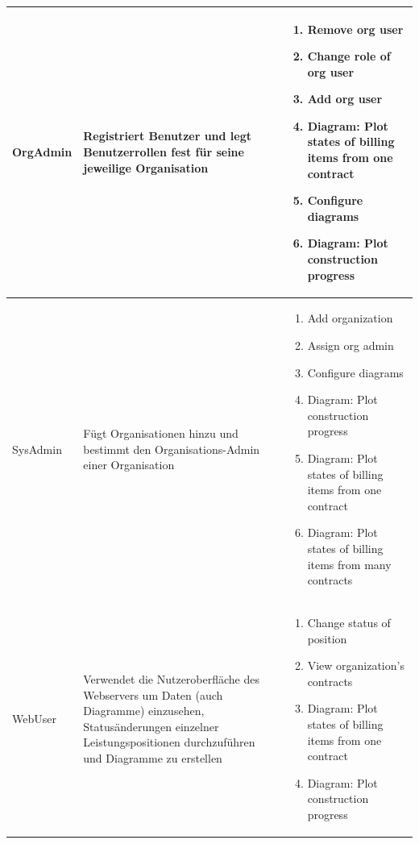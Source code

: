 \begin{longtable}[c]{|p{2cm}|p{6cm}|p{6cm}|}
    OrgAdmin        & Registriert Benutzer und legt Benutzerrollen fest für seine jeweilige Organisation                                                                                                      &
    \begin{enumerate}
        \item Remove org user
        \item Change role of org user
        \item Add org user
        \item Diagram: Plot states of billing items from one contract
        \item Configure diagrams
        \item Diagram: Plot construction progress
    \end{enumerate}                                                                                                                                                                                                                        \\ \hline
    SysAdmin        & F\"ugt Organisationen hinzu und bestimmt den Organisations-Admin einer Organisation                                                                                                     &
    \begin{enumerate}
        \item Add organization
        \item Assign org admin
        \item Configure diagrams
        \item Diagram: Plot construction progress
        \item Diagram: Plot states of billing items from one contract
        \item Diagram: Plot states of billing items from many contracts
    \end{enumerate}                                                                                                                                                                                                                        \\ \hline
    WebUser         & Verwendet die Nutzeroberfl\"ache des Webservers um Daten (auch Diagramme) einzusehen,  Status\"anderungen einzelner Leistungspositionen durchzuf\"uhren und Diagramme zu erstellen      &
    \begin{enumerate}
        \item Change status of position
        \item View organization's contracts
        \item Diagram: Plot states of billing items from one contract
        \item Diagram: Plot construction progress
    \end{enumerate}                                                                                                                                                                                                                        \\\hline
\end{longtable}

